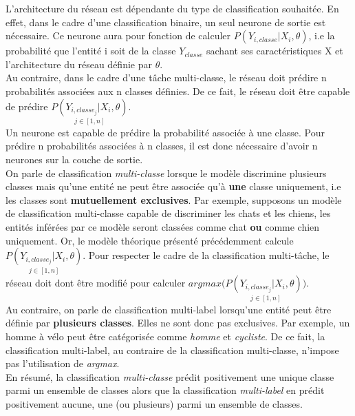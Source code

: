 \noindent L'architecture du réseau est dépendante du type de classification souhaitée. En effet, dans le cadre d'une classification binaire, un seul neurone de sortie est nécessaire. Ce neurone aura pour fonction de calculer $P(Y_{i,classe}| X_i, \theta)$, i.e la probabilité que l'entité i soit de la classe $Y_{classe}$ sachant ses caractéristiques X et l'architecture du réseau définie par $\theta$.\\

\noindent Au contraire, dans le cadre d'une tâche multi-classe, le réseau doit prédire n probabilités associées aux n classes définies. De ce fait, le réseau doit être capable de prédire $\underset{j \in [1,n]}{P(Y_{i,classe_{j}}| X_i, \theta)}$.\\

\noindent Un neurone est capable de prédire la probabilité associée à une classe. Pour prédire n probabilités associées à n classes, il est donc nécessaire d'avoir n neurones sur la couche de sortie.\\

\noindent On parle de classification \textit{multi-classe} lorsque le modèle discrimine plusieurs classes mais qu'une entité ne peut être associée qu'à \textbf{une} classe uniquement, i.e les classes sont \textbf{mutuellement exclusives}. Par exemple, supposons un modèle de classification multi-classe capable de discriminer les chats et les chiens, les entités inférées par ce modèle seront classées comme chat \textbf{ou} comme chien uniquement. Or, le modèle théorique présenté précédemment calcule $\underset{j \in [1,n]}{P(Y_{i,classe_{j}}| X_i, \theta)}$. Pour respecter le cadre de la classification multi-tâche, le réseau doit dont être modifié pour calculer $argmax(\underset{j \in [1,n]}{P(Y_{i,classe_{j}}| X_i, \theta))}$.\\

\noindent Au contraire, on parle de classification multi-label lorsqu'une entité peut être définie par \textbf{plusieurs classes}. Elles ne sont donc pas exclusives. Par exemple, un homme à vélo peut être catégorisée comme \textit{homme} et \textit{cycliste}. De ce fait, la classification multi-label, au contraire de la classification multi-classe, n'impose pas l'utilisation de \textit{argmax}.\\

\noindent En résumé, la classification \textit{multi-classe} prédit positivement une unique classe parmi un ensemble de classes alors que la classification \textit{multi-label} en prédit positivement aucune, une (ou plusieurs) parmi un ensemble de classes.\\

